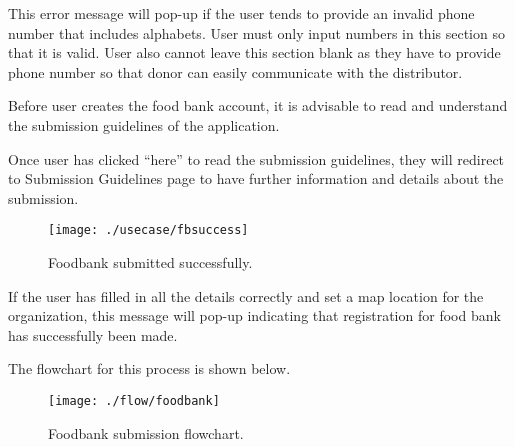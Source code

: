 \documentclass[conference]{IEEEtran}
\begin{document}
This error message will pop-up if the user tends to provide an invalid phone number that includes alphabets. User must only input numbers in this section so that it is valid. User also cannot leave this section blank as they have to provide phone number so that donor can easily communicate with the distributor.

Before user creates the food bank account, it is advisable to read and understand the submission guidelines of the application. 

Once user has clicked “here” to read the submission guidelines, they will redirect to Submission Guidelines page to have further information and details about the submission. 
\begin{figure}[h!]
\texttt{[image: ./usecase/fbsuccess]}
\centering
\caption{Foodbank submitted successfully.}
\end{figure}

If the user has filled in all the details correctly and set a map location for the organization, this message will pop-up indicating that registration for food bank has successfully been made.

The flowchart for this process is shown below.

\begin{figure}[h!]
\texttt{[image: ./flow/foodbank]}
\centering
\caption{Foodbank submission flowchart.}
\end{figure}
\end{document}
